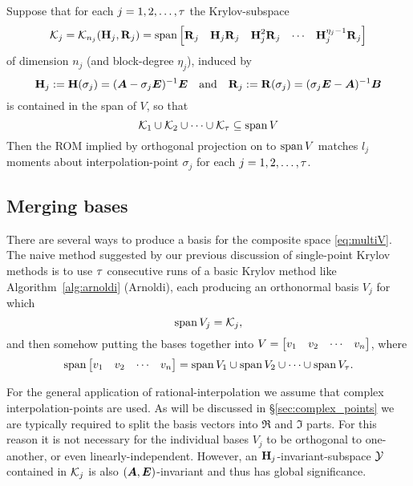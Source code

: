 \begin{comment}%
\cite{RAMAO,AORA,lassaux2003model,frangos2008}) are more recent multi-point rational-interpolation methods. Also a Jacobi-Davidson MOR method \cite{jacobiMOR}.   Lee, Chu, and Feng's  RAMAO/AORA method (Rational Arnoldi Method with Adaptive Order selection/ Adaptive-Order Rational-Arnoldi) \cite{RAMAO,AORA} breaths new life into an adaptive point-selection method introduced by \cite{gallivan1996rational}, based on the sequence of ROM \emph{moment-errors} implied by the sequence of candidate-vectors $\vh_k$ of the Arnoldi process \S\ref{sec:arnoldi}.
\end{comment}%

   Suppose that for each $j = 1,2,\ldots,\tau$ the Krylov-subspace 
\[ 
\mathcal{K}_j=\mathcal{K}_{n_j}({\textbf{\textup{H}}_j},{\textbf{\textup{R}}_j}) = \operatorname*{span}\begin{bmatrix} \textbf{\textup{R}}_j & \textbf{\textup{H}}_j \textbf{\textup{R}}_j & \textbf{\textup{H}}_j^2 \textbf{\textup{R}}_j & \cdots & \textbf{\textup{H}}_j^{\eta_j-1} \textbf{\textup{R}}_j\end{bmatrix}
\]
 of dimension $n_j$ (and block-degree $\eta_j$), induced by 
\[
 \textbf{\textup{H}}_j := \textbf{\textup{H}}(\sigma_j)=(\bm{A}-\sigma_j \bm{E})^{-1}\bm{E} \quad \text{and} \quad 
 \textbf{\textup{R}}_j := \textbf{\textup{R}}(\sigma_j) = (\sigma_j \bm{E} - \bm{A})^{-1}\bm{B}
\]
is contained in the span of $V$, so that
\begin{equation}
\mathcal{K}_1 \cup \mathcal{K}_2 \cup \cdots \cup \mathcal{K}_\tau \subseteq \operatorname*{span} V
\label{eq:multiV} 
\end{equation}
Then the ROM implied by orthogonal projection on to  $\operatorname*{span} V$ matches $l_j$ moments about interpolation-point $\sigma_j$ for each $j=1,2,\ldots,\tau$.




\subsection{Merging bases}
There are several ways to produce a basis for the composite space \eqref{eq:multiV}.  The naive method suggested by our previous discussion of single-point Krylov methods is to use $\tau$ consecutive runs of a basic Krylov method like Algorithm~\ref{alg:arnoldi} (Arnoldi), each producing an orthonormal basis $V_j$ for which 
\[
\operatorname*{span} V_j = \mathcal{K}_j,
\]
and then somehow putting the bases together into $V = \begin{bmatrix} v_1&v_2&\cdots&v_n\end{bmatrix}$, where 
\begin{equation}
\operatorname*{span}  \begin{bmatrix} v_1&v_2&\cdots&v_n\end{bmatrix} = \operatorname*{span} V_1 \cup \operatorname*{span} V_2 \cup \cdots \cup \operatorname*{span} V_\tau.
\label{eq:multiV2}
\end{equation}


   For the general application of rational-interpolation we assume that complex interpolation-points are used.  As will be discussed in \S\ref{sec:complex_points} we are typically required to split the basis vectors into $\Re$ and $\Im$  parts.   For this reason it is not necessary for the individual bases $V_j$ to be orthogonal to one-another, or even linearly-independent.  However, an $\textbf{\textup{H}}_j$-invariant-subspace  $\mathcal{Y}$ contained  in $\mathcal{K}_j$ is also $(\bm{A},\bm{E})$-invariant and thus has global significance. 

